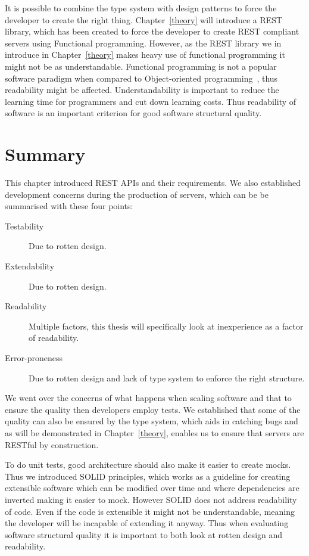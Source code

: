 It is possible to combine the type system with design patterns to force the
developer to create the right thing. Chapter~\ref{theory} will introduce a REST
library, which has been created to force the developer to create REST compliant
servers using Functional programming. However, as the REST library we in
introduce in Chapter~\ref{theory} makes heavy use of functional programming it
might not be as understandable.  Functional programming is not a popular
software paradigm when compared to Object-oriented
programming~\cite{tiobe2013tiobe}, thus readability might be affected.
Understandability is important to reduce the learning time for programmers and
cut down learning costs. Thus readability of software is an important criterion
for good software structural quality.

\section{Summary}\label{backgroundconclusion}

This chapter introduced REST APIs and their requirements.  We also established
development concerns during the production of servers, which can be be
summarised with these four points:

\begin{description}
    \item[Testability] Due to rotten design.
    \item[Extendability] Due to rotten design.
    \item[Readability] Multiple factors, this thesis will specifically look at 
		inexperience as a factor of readability.
    \item[Error-proneness] Due to rotten design and lack of type system to
        enforce the right structure.
\end{description}

We went over the concerns of what happens when scaling software and that to
ensure the quality then developers employ tests. We established that some of the
quality can also be ensured by the type system, which aids in catching bugs and
as will be demonstrated in Chapter~\ref{theory}, enables us to ensure that
servers are RESTful by construction. 

To do unit tests, good architecture should also make it easier to create mocks.
Thus we introduced SOLID principles, which works as a guideline for creating
extensible software which can be modified over time and where dependencies are
inverted making it easier to mock. However SOLID does not address readability of
code. Even if the code is extensible it might not be understandable, meaning the
developer will be incapable of extending it anyway.  Thus when evaluating
software structural quality it is important to both look at rotten design and
readability.
